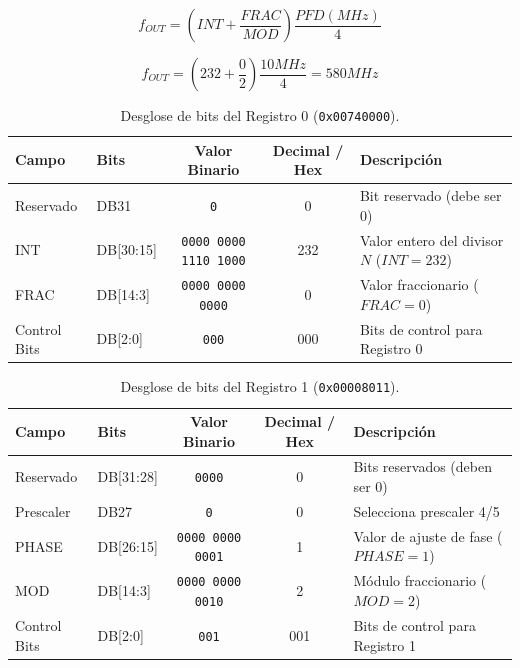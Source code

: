 \documentclass[11pt,a4paper,twoside]{report}
\begin{document}
	\begin{equation}
		f_{OUT}= \left(INT + \frac{FRAC}{MOD}\right) \frac{PFD(MHz)}{4}
	\end{equation}
	
	\begin{equation}
		f_{OUT}= \left( 232 + \frac{0}{2}\right)\frac{10MHz}{4} = 580MHz
	\end{equation}
	
	\begin{table}[htbp]
		\centering
		\label{tab:adf4350_reg0}
		\begin{tabularx}{\textwidth}{l l c c X}
			\toprule
			\textbf{Campo} & \textbf{Bits} & \textbf{Valor Binario} & \textbf{Decimal / Hex} & \textbf{Descripción} \\
			\midrule
			Reservado & DB31 & \texttt{0} & 0 & Bit reservado (debe ser 0) \\
			INT & DB[30:15] & \texttt{0000 0000 1110 1000} & 232 & Valor entero del divisor $N$ ($INT = 232$) \\
			FRAC & DB[14:3] & \texttt{0000 0000 0000} & 0 & Valor fraccionario ($FRAC = 0$) \\
			Control Bits & DB[2:0] & \texttt{000} & 000 & Bits de control para Registro 0 \\
			\bottomrule
		\end{tabularx}
		\caption{Desglose de bits del Registro 0 (\texttt{0x00740000}).}
	\end{table}
	
	\begin{table}[htbp]
		\centering
		\begin{tabularx}{\textwidth}{l l c c X}
			\toprule
			\textbf{Campo} & \textbf{Bits} & \textbf{Valor Binario} & \textbf{Decimal / Hex} & \textbf{Descripción} \\
			\midrule
			Reservado & DB[31:28] & \texttt{0000} & 0 & Bits reservados (deben ser 0) \\
			Prescaler & DB27 & \texttt{0} & 0 & Selecciona prescaler 4/5 \\
			PHASE & DB[26:15] & \texttt{0000 0000 0001} & 1 & Valor de ajuste de fase ($PHASE = 1$) \\
			MOD & DB[14:3] & \texttt{0000 0000 0010} & 2 & Módulo fraccionario ($MOD = 2$) \\
			Control Bits & DB[2:0] & \texttt{001} & 001 & Bits de control para Registro 1 \\
			\bottomrule
		\end{tabularx}
		\caption{Desglose de bits del Registro 1 (\texttt{0x00008011}).}
		\label{tab:adf4350_reg1}
	\end{table}\newpage
	
\end{document}
